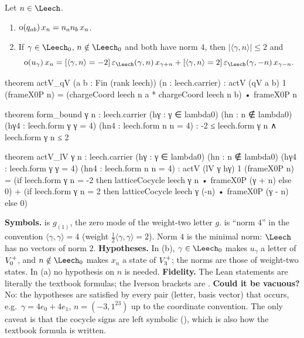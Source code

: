 \begin{proposition}\label{ch13:lem:source-modes}
Let $n\in\Leech$.
\begin{enumerate}[label=(\alph*)]
\item $\operatorname{o}(q_{ab})\,x_n=n_an_b\,x_n$.
\item If $\gamma\in\Leech_0$, $n\notin\Leech_0$ and both have norm $4$, then $|\langle\gamma,n\rangle|\le2$ and
\begin{equation*}
  \chthirteeno(u_\gamma)\,x_n=[\langle\gamma,n\rangle=-2]\,\varepsilon_\Leech(\gamma,n)\,x_{\gamma+n}
  +[\langle\gamma,n\rangle=2]\,\varepsilon_\Leech(\gamma,-n)\,x_{\gamma-n}.
\end{equation*}
\end{enumerate}
\end{proposition}
\begin{leancode}
theorem actV_qV (a b : Fin (rank leech)) (n : leech.carrier) :
    actV (qV a b) 1 (frameX0P n)
      = (chargeCoord leech n a * chargeCoord leech n b) • frameX0P n

theorem form_bound {γ n : leech.carrier} (hγ : γ ∈ lambda0) (hn : n ∉ lambda0)
    (hγ4 : leech.form γ γ = 4) (hn4 : leech.form n n = 4) :
    -2 ≤ leech.form γ n ∧ leech.form γ n ≤ 2

theorem actV_lV {γ n : leech.carrier} (hγ : γ ∈ lambda0) (hn : n ∉ lambda0)
    (hγ4 : leech.form γ γ = 4) (hn4 : leech.form n n = 4) :
    actV (lV γ hγ) 1 (frameX0P n)
      = (if leech.form γ n = -2 then latticeCocycle leech γ n • frameX0P (γ + n) else 0)
        + (if leech.form γ n = 2 then latticeCocycle leech γ (-n) • frameX0P (γ - n) else 0)
\end{leancode}
\begin{dictionary}
\textbf{Symbols.}  is $g_{(1)}$, the zero mode of the weight-two letter $g$.
 is ``norm $4$'' in the convention $\langle\gamma,\gamma\rangle=4$ (weight
$\tfrac12\langle\gamma,\gamma\rangle=2$). Norm $4$ is the minimal norm: $\Leech$ has no vectors of norm $2$.
\textbf{Hypotheses.} In (b), $\gamma\in\Leech_0$ makes $u_\gamma$ a letter of $V_0^{+}$, and $n\notin\Leech_0$
makes $x_n$ a state of $V_3^{+}$; the norms are those of weight-two states. In (a) no hypothesis
on $n$ is needed. \textbf{Fidelity.} The Lean statements are literally the textbook formulas; the
Iverson brackets are . \textbf{Could it be vacuous?} No: the hypotheses are
satisfied by every pair (letter, basis vector) that occurs, e.g.\ $\gamma=4e_0+4e_1$, $n=(-3,1^{23})$
up to the coordinate convention. The only caveat is that the cocycle signs are left
symbolic (), which is also how the textbook formula is written.
\end{dictionary}
